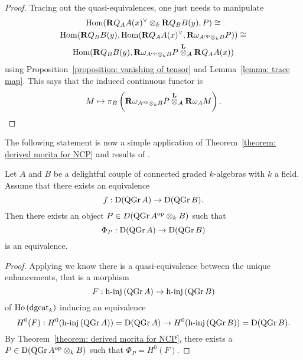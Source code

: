 \begin{proof}
  Tracing out the quasi-equivalences, one just needs to manipulate 
  \begin{gather*}
    \operatorname{Hom} (\mathbf{R}Q_A A(x)^\vee \otimes_k \mathbf{R}Q_B B(y), P) \cong\\
    \operatorname{Hom} ( \mathbf{R}Q_B B(y) , \operatorname{Hom}( \mathbf{R}Q_A A(x)^\vee, \mathbf{R}\omega_{A^{\operatorname{op}} \otimes_k B} P))
    \cong
    \\ \operatorname{Hom} ( \mathbf{R}Q_B B(y) , \mathbf{R}\omega_{A^{\operatorname{op}} \otimes_k B} P \overset{\mathbf{L}}{\otimes}_{\mathcal A} \mathbf{R}Q_A A(x) ) 
  \end{gather*}
  using Proposition~\ref{proposition: vanishing of tensor} and Lemma~\ref{lemma: trace map}. This says that the induced continuous functor is
  \begin{displaymath}
    M \mapsto \pi_B \left( \mathbf{R}\omega_{A^{\operatorname{op}} \otimes_k B} P \overset{\mathbf{L}}{\otimes}_{\mathcal A} \mathbf{R}\omega_A M \right). 
  \end{displaymath}
\end{proof}

The following statement is now a simple application of Theorem~\ref{theorem: derived morita for NCP} and results of \textcite{Lunts-Orlov}. 

\begin{corollary} \label{corollary: NCP morita}
  Let \(A\) and \(B\) be a delightful couple of connected graded \(k\)-algebras with \(k\) a field. Assume that there exists an equivalence
  \begin{displaymath}
    f : \mathrm{D} (\operatorname{QGr}A) \to \mathrm{D} (\operatorname{QGr}B).
  \end{displaymath}
  Then there exists an object \(P \in D ( \operatorname{QGr}A^{\operatorname{op}} \otimes_k B )\) such that 
  \begin{displaymath}
    \Phi_P : \mathrm{D} ( \operatorname{QGr}A) \to \mathrm{D} (\operatorname{QGr}B )
  \end{displaymath}
  is an equivalence.
\end{corollary}

\begin{proof}
  Applying \textcite[Theorem 1]{Lunts-Orlov} we know there is a quasi-equivalence between the unique enhancements, that is a morphism
  \[F : \operatorname{h-inj}\left(\operatorname{QGr}A\right) \to \operatorname{h-inj}\left(\operatorname{QGr}B\right)\]
  of \(\operatorname{Ho}\left(\operatorname{dgcat}_k\right)\) inducing an equivalence
  \begin{displaymath}
    H^0(F) : H^0(\operatorname{h-inj}\left( \operatorname{QGr}A \right)) = \mathrm{D}(\operatorname{QGr}A) \to H^0(\operatorname{h-inj}\left( \operatorname{QGr}B \right)) = \mathrm{D}(\operatorname{QGr}B).
  \end{displaymath}
  By Theorem~\ref{theorem: derived morita for NCP}, there exists a \(P \in \mathrm{D}(\operatorname{QGr}A^{\operatorname{op}} \otimes_k B)\) such that \(\Phi_P = H^0(F)\). 
\end{proof}

